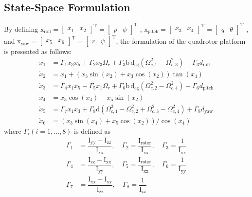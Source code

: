 \documentclass[peerreview]{IEEEtran}
\begin{document}
\subsection{State-Space Formulation}\label{sec:state-space}
By defining $\boldsymbol{\mathrm{x}}_{\text{roll}} = \begin{bmatrix}
	x_1 & x_2
\end{bmatrix}^{\mathrm{T}}=
\begin{bmatrix}
	p & \phi
\end{bmatrix}^{\mathrm{T}}$
,
$\boldsymbol{\mathrm{x}}_{\text{pitch}} = \begin{bmatrix}
	x_3 & x_4 \end{bmatrix}^{\mathrm{T}} = 
	\begin{bmatrix}
	q & \theta \end{bmatrix}^{\mathrm{T}}
	$
	, and 
	$\boldsymbol{\mathrm{x}}_{\text{yaw}} = 
	\begin{bmatrix}
		x_5 & x_6
	\end{bmatrix}^{\mathrm{T}} = 
	\begin{bmatrix}
		r & \psi
	\end{bmatrix}^{\mathrm{T}}$, the formulation of the quadrotor platform is presented as follows:
\begin{align}\label{eq:diffeq}
	\dot x_1 &= \Gamma_1x_3 x_5 + \Gamma_2 x_3 \Omega_r + \Gamma_3\mathrm{b\,d}_{\text{cg}} (\Omega_{c, 1}^2 - \Omega_{c, 3}^2) + \Gamma_3d_{\text{roll}} \\[0.5em]
	\dot x_2 &= x_1 + (x_3\sin(x_2) + x_3\cos(x_2))\tan(x_4)
    \\[0.5em]
    \dot x_3 &= \Gamma_4 x_1 x_5 - \Gamma_5 x_1 \Omega_r +  \Gamma_6\mathrm{b\,d}_{\text{cg}} (\Omega_{c, 2}^2 - \Omega_{c, 4}^2) + \Gamma_6d_{\text{pitch}}\\[0.5em] \label{eq:diffeq-mid}
	\dot x_4 &= x_3\cos(x_4) - x_5\sin(x_2)\\[0.5em]
    \dot x_5 &= \Gamma_7x_1 x_3 +  \Gamma_8\mathrm{d} (\Omega_{c, 1}^2 - \Omega_{c, 2}^2 + \Omega_{c, 3}^2 - \Omega_{c, 4}^2) + \Gamma_8d_{\text{yaw}}\\[0.5em] 
    \dot x_6 &= (x_3\sin(x_4) + x_5\cos(x_2))/\cos(x_4) \label{eq:diffeq-end}
\end{align}
where $\Gamma_i (i = 1, \ldots, 8)$ is defined as
\begin{equation}
	\begin{split}
		\Gamma_1 &= \dfrac{\mathrm{I}_{\text{yy}} - \mathrm{I}_{\text{zz}}}{\mathrm{I}_{\text{xx}}}, \quad \Gamma_2 = \dfrac{\mathrm{I}_{\text{rotor}}}{\mathrm{I}_{\text{xx}}}, \quad \Gamma_3 = \dfrac{1}{\mathrm{I}_{\text{xx}}}\\ \Gamma_4 &= \dfrac{\mathrm{I}_{\text{zz}} - \mathrm{I}_{\text{xx}}}{\mathrm{I}_{\text{yy}}}, \quad \Gamma_5 = \dfrac{\mathrm{I}_{\text{rotor}}}{\mathrm{I}_{\text{xx}}}, \quad \Gamma_6 = \dfrac{1}{\mathrm{I}_{\text{yy}}} \\ \Gamma_7 &= \dfrac{\mathrm{I}_{\text{xx}} - \mathrm{I}_{\text{yy}}}{\mathrm{I}_{\text{zz}}}, \quad \Gamma_8 = \dfrac{1}{\mathrm{I}_{\text{zz}}}
	\end{split}
\end{equation}
\end{document}
